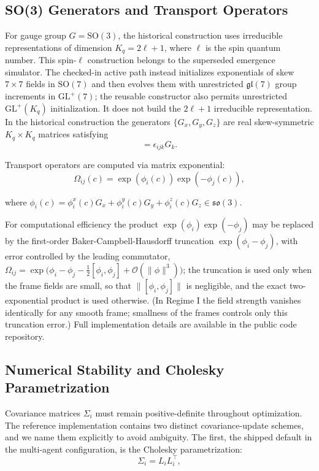 \documentclass[11pt]{article}
\begin{document}
\subsection{SO(3) Generators and Transport Operators}

For gauge group $G = \mathrm{SO}(3)$, the historical construction uses irreducible representations of dimension $K_q=2\ell+1$, where $\ell$ is the spin quantum number. This spin-$\ell$ construction belongs to the superseded emergence simulator. The checked-in active path instead initializes exponentials of skew $7\times7$ fields in $\mathrm{SO}(7)$ and then evolves them with unrestricted $\mathfrak{gl}(7)$ group increments in $\mathrm{GL}^+(7)$; the reusable constructor also permits unrestricted $\mathrm{GL}^+(K_q)$ initialization. It does not build the $2\ell+1$ irreducible representation. In the historical construction the generators $\{G_x,G_y,G_z\}$ are real skew-symmetric $K_q\times K_q$ matrices satisfying
\begin{equation}
[G_i, G_j] = \epsilon_{ijk} G_k.
\end{equation}

Transport operators are computed via matrix exponential:
\begin{equation}
\Omega_{ij}(c) = \exp(\phi_i(c)) \exp(-\phi_j(c)),
\end{equation}

where $\phi_i(c) = \phi_i^x(c) G_x + \phi_i^y(c) G_y + \phi_i^z(c) G_z \in \mathfrak{so}(3)$.

For computational efficiency the product $\exp(\phi_i)\exp(-\phi_j)$ may be replaced by the first-order Baker-Campbell-Hausdorff truncation $\exp(\phi_i - \phi_j)$, with error controlled by the leading commutator, $\Omega_{ij} = \exp\big(\phi_i - \phi_j - \tfrac{1}{2}[\phi_i, \phi_j] + \mathcal{O}(\|\phi\|^3)\big)$; the truncation is used only when the frame fields are small, so that $\|[\phi_i, \phi_j]\|$ is negligible, and the exact two-exponential product is used otherwise. (In Regime I the field strength vanishes identically for any smooth frame; smallness of the frames controls only this truncation error.) Full implementation details are available in the public code repository.

\subsection{Numerical Stability and Cholesky Parametrization}

Covariance matrices $\Sigma_i$ must remain positive-definite throughout optimization. The reference implementation contains two distinct covariance-update schemes, and we name them explicitly to avoid ambiguity. The first, the shipped default in the multi-agent configuration, is the Cholesky parametrization:
\begin{equation}
\Sigma_i = L_i L_i^\top,
\end{equation}
\end{document}

